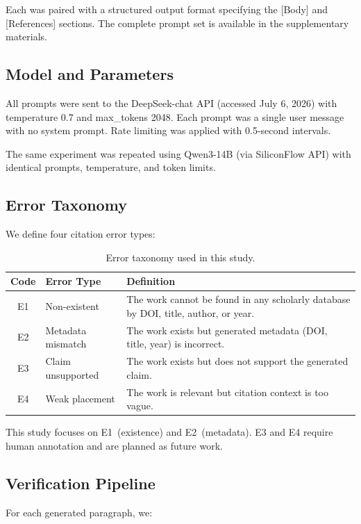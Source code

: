 \documentclass[11pt,a4paper]{article}
\begin{document}
Each was paired with a structured output format specifying the [Body] and [References] sections. The complete prompt set is available in the supplementary materials.

\subsection{Model and Parameters}

All prompts were sent to the DeepSeek-chat API (accessed July 6, 2026) with temperature 0.7 and max\_tokens 2048. Each prompt was a single user message with no system prompt. Rate limiting was applied with 0.5-second intervals.

The same experiment was repeated using Qwen3-14B (via SiliconFlow API) with identical prompts, temperature, and token limits.

\subsection{Error Taxonomy}

We define four citation error types:

\begin{table}[ht]
\centering
\begin{tabular}{cll}
\toprule
\textbf{Code} & \textbf{Error Type} & \textbf{Definition} \\
\midrule
E1 & Non-existent & The work cannot be found in any scholarly database by DOI, title, author, or year. \\
E2 & Metadata mismatch & The work exists but generated metadata (DOI, title, year) is incorrect. \\
E3 & Claim unsupported & The work exists but does not support the generated claim. \\
E4 & Weak placement & The work is relevant but citation context is too vague. \\
\bottomrule
\end{tabular}
\caption{Error taxonomy used in this study.}
\label{tab:error_taxonomy}
\end{table}

This study focuses on E1~(existence) and E2~(metadata). E3 and E4 require human annotation and are planned as future work.

\subsection{Verification Pipeline}

For each generated paragraph, we:
\end{document}

